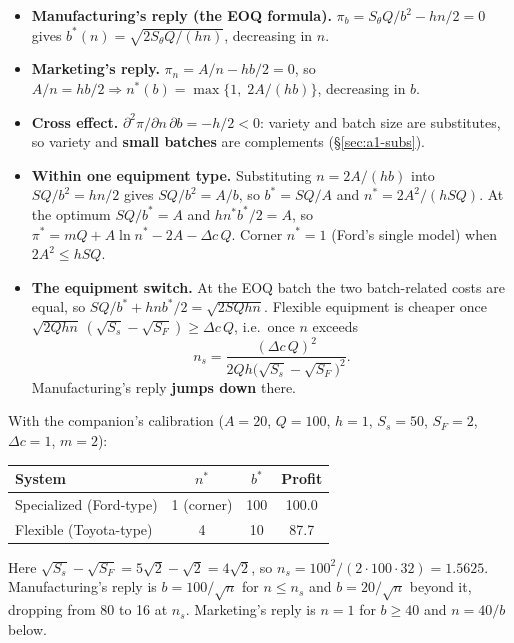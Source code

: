 \begin{itemize}
  \item \textbf{Manufacturing's reply (the EOQ formula).} $\pi_b = S_\theta Q/b^2 - hn/2 = 0$
    gives $b^*(n) = \sqrt{2 S_\theta Q / (h n)}$, decreasing in $n$.
  \item \textbf{Marketing's reply.} $\pi_n = A/n - hb/2 = 0$, so
    $A/n = h b / 2 \Rightarrow n^*(b) = \max\{1, \; 2A/(h b)\}$, decreasing in $b$.
  \item \textbf{Cross effect.} $\partial^2 \pi / \partial n\, \partial b = -h/2 < 0$: variety and
    batch size are substitutes, so variety and \textbf{small batches} are complements
    (\S\ref{sec:a1-subs}).
  \item \textbf{Within one equipment type.} Substituting $n = 2A/(hb)$ into $S Q/b^2 = hn/2$ gives
    $SQ/b^2 = A/b$, so $b^* = S Q / A$ and $n^* = 2A^2/(h S Q)$. At the optimum
    $SQ/b^* = A$ and $hn^*b^*/2 = A$, so $\pi^* = mQ + A \ln n^* - 2A - \Delta c\, Q$. Corner
    $n^* = 1$ (Ford's single model) when $2A^2 \le h S Q$.
  \item \textbf{The equipment switch.} At the EOQ batch the two batch-related costs are equal, so
    $S Q/b^* + h n b^*/2 = \sqrt{2 S Q h n}$. Flexible equipment is cheaper once
    $\sqrt{2Qhn}\,(\sqrt{S_s} - \sqrt{S_F}) \ge \Delta c\, Q$, i.e.\ once $n$ exceeds
    \[
      n_s = \frac{(\Delta c\, Q)^2}{2 Q h \big(\sqrt{S_s} - \sqrt{S_F}\big)^2}.
    \]
    Manufacturing's reply \textbf{jumps down} there.
\end{itemize}

With the companion's calibration ($A = 20$, $Q = 100$, $h = 1$, $S_s = 50$, $S_F = 2$,
$\Delta c = 1$, $m = 2$):

\begin{center}
\begin{tabular}{@{}lccc@{}}
\toprule
System & $n^*$ & $b^*$ & Profit \\
\midrule
Specialized (Ford-type) & 1 (corner) & 100 & 100.0 \\
Flexible (Toyota-type) & 4 & 10 & 87.7 \\
\bottomrule
\end{tabular}
\end{center}

Here $\sqrt{S_s} - \sqrt{S_F} = 5\sqrt2 - \sqrt2 = 4\sqrt2$, so
$n_s = 100^2/(2\cdot 100\cdot 32) = 1.5625$. Manufacturing's reply is $b = 100/\sqrt{n}$ for
$n \le n_s$ and $b = 20/\sqrt{n}$ beyond it, dropping from 80 to 16 at $n_s$. Marketing's reply is
$n = 1$ for $b \ge 40$ and $n = 40/b$ below.

